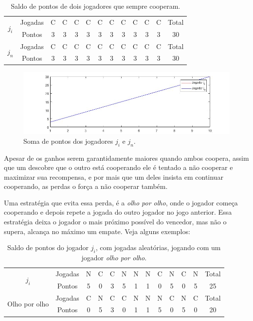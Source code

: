 \begin{table}[H]
\centering
\begin{tabular}{|c|c|c|c|c|c|c|c|c|c|c|c|c|}\hline
\multirow{2}{*}{$j_i$} & Jogadas & C & C & C & C & C & C & C & C & C & C & Total\\\cline{2-12}
 & Pontos & 3 & 3 & 3 & 3 & 3 & 3 & 3 & 3 & 3 & 3 & 30\\\hline\hline
\multirow{2}{*}{$j_n$} & Jogadas & C & C & C & C & C & C & C & C & C & C & Total\\\cline{2-12}
 & Pontos & 3 & 3 & 3 & 3 & 3 & 3 & 3 & 3 & 3 & 3 & 30\\\hline
\end{tabular}
\caption{Saldo de pontos de dois jogadores que sempre cooperam.}
\label{tab4}
\end{table}

\begin{figure}[H]
\centering
\includegraphics[width=14cm]{imagens/graf4.jpg}
\caption{Soma de pontos dos jogadores $j_i$ e $j_n$.}
\label{fig4}
\end{figure}

Apesar de os ganhos serem garantidamente maiores quando ambos coopera, assim que um descobre que o outro está cooperando ele é tentado a não cooperar e maximizar sua recompensa, e por mais que um deles insista em continuar cooperando, as perdas o força a não cooperar também.

Uma estratégia que evita essa perda, é a \textit{olho por olho}, onde o jogador começa cooperando e depois repete a jogada do outro jogador no jogo anterior. Essa estratégia deixa o jogador o mais próximo possível do vencedor, mas não o supera, alcança no máximo um empate. Veja alguns exemplos: 

\begin{table}[H]
\centering
\begin{tabular}{|c|c|c|c|c|c|c|c|c|c|c|c|c|}\hline
\multirow{2}{*}{$j_i$} & Jogadas & N & C & C & N & N & N & C & N &	C &	N & Total\\\cline{2-12}
 & Pontos & 5 & 0 & 3 & 5 & 1 & 1 & 0 & 5 & 0 & 5 & 25\\\hline\hline
\multirow{2}{*}{Olho por olho} & Jogadas & C & N & C & C & N & N & N & C &	N &	C & Total\\\cline{2-12}
 & Pontos & 0 & 5 & 3 & 0 & 1 & 1 & 5 & 0 & 5 & 0 & 20\\\hline
\end{tabular}
\caption{Saldo de pontos do jogador $j_i$, com jogadas aleatórias, jogando com um jogador \textit{olho por olho}.}
\label{tab5}
\end{table}


